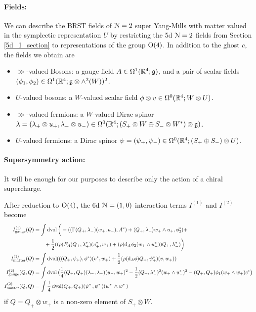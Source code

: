 \documentclass[10pt, oneside]{article}
\begin{document}
\vspace{-10pt}
\paragraph{Fields:}  We can describe the BRST fields of $\mathcal{N}=2$ super Yang-Mills with matter valued in the symplectic representation $U$ by restricting the 5d $\mathcal{N}=2$ fields from Section \ref{5d_1_section} to representations of the group $\mathrm{O}(4)$.  In addition to the ghost $c$, the fields we obtain are
\begin{itemize}
 \item $\gg$-valued Bosons: a gauge field $A \in \Omega^1(\mathbb R^4; \mathfrak{g})$, and a pair of scalar fields $(\phi_1,\phi_2) \in \Omega^1(\mathbb R^4; \mathfrak{g} \otimes \wedge^2(W))^2$.
 \item $U$-valued bosons: a $W$-valued scalar field $\phi \otimes v \in \Omega^0(\mathbb R^4; W \otimes U)$.
 \item $\gg$-valued fermions: a $W$-valued Dirac spinor $\lambda = (\lambda_+ \otimes u_+, \lambda_-\otimes u_-) \in \Omega^0(\mathbb R^4; (S_+ \otimes W \oplus S_- \otimes W^*) \otimes \mathfrak{g})$.
 \item $U$-valued fermions: a Dirac spinor $\psi = (\psi_+,\psi_-) \in \Omega^0(\mathbb R^4; (S_+\oplus S_-) \otimes U)$.
\end{itemize}

\vspace{-10pt}
\paragraph{Supersymmetry action:} 
It will be enough for our purposes to describe only the action of a chiral supercharge.
\begin{prop} \label{4d_2_susy_action_prop}
After reduction to $\mathrm{O}(4)$, the 6d $\mathcal{N}=(1,0)$ interaction terms $I^{(1)}$ and $I^{(2)}$ become
\begin{align*}
I^{(1)}_{\mathrm{gauge}}(Q) &= \int \operatorname{dvol} \bigg(-( (\Gamma(Q_+,\lambda_-)(w_+,u_-), A^*) + \langle Q_+,\lambda_+\rangle w_+ \wedge u_+, \phi_2^* ) + \\
&\qquad  + \frac 12 ((\rho(F_A)Q_+, \lambda_+^*)(u_+^*,  w_+) + (\rho({\rm d}_A \phi_2(w_+ \wedge u_-^*))Q_+, \lambda_-^*) \bigg)\\
I^{(1)}_{\mathrm{matter}}(Q) &= \int \operatorname{dvol} (((Q_+,\psi_+), \phi^*)(v^*,w_+) + \frac 12 (\rho({\rm d}_A \phi)Q_+, \psi_+^*)(v,w_+)) \\
I^{(2)}_{\mathrm{gauge}}(Q,Q) &= \int \operatorname{dvol} \big(\frac 14 (Q_+,Q_+)(\lambda_-,\lambda_-)(u_-,w_+)^2 - \frac 12  (Q_+, \lambda_-^*)^2(w_+ \wedge u_-^*)^2 - (Q_+,Q_+)\phi_1(w_+ \wedge w_+)c^* \big) \\
I^{(2)}_{\mathrm{matter}}(Q,Q) &= \int \frac 14 \operatorname{dvol} (Q_+,Q_+)(\psi_-^*,\psi_-^*)(w_-^* \wedge w_-^*)
\end{align*}
if $Q=Q_+ \otimes w_+$ is a non-zero element of $S_+ \otimes W$. 
\end{prop}
\end{document}
